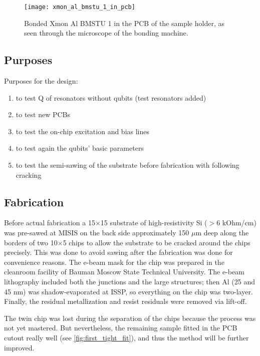 \documentclass[12pt, twoside]{report}
\numberwithin{equation}{section}
\begin{document}
\begin{figure}
\centering
\texttt{[image: xmon\_al\_bmstu\_1\_in\_pcb]}
\caption{Bonded Xmon Al BMSTU 1 in the PCB of the sample holder, as seen through the microscope of the bonding machine.}
\label{fig:first_tight_fit}
\end{figure}

\subsection{Purposes}


Purposes for the design:
\begin{enumerate}[label=(\alph*), leftmargin=1.5cm]
\itemsep0pt
\item to test Q of resonators without qubits (test resonators added)

\item to test new PCBs

\item to test the on-chip excitation and bias lines

\item to test again the qubits' basic parameters

\item to test the semi-sawing of the substrate before fabrication with following cracking

\end{enumerate}


\subsection{Fabrication}

Before actual fabrication a 15$\times$15 substrate of high-resistivity Si ($> 6$ kOhm/cm) was pre-sawed at MISIS on the back side approximately 150 $\mu$m deep along the borders of two 10$\times$5 chips to allow the substrate to be cracked around the chips precisely. This was done to avoid sawing after the fabrication was done for convenience reasons. The e-beam mask for the chip was prepared in the cleanroom facility of Bauman Moscow State Technical University. The e-beam lithography included both the junctions and the large structures; then Al (25 and 45 nm) was shadow-evaporated at ISSP, so everything on the chip was two-layer. Finally, the residual metallization and resist residuals were removed via lift-off.

The twin chip was lost during the separation of the chips because the process was not yet mastered. But nevertheless, the remaining sample fitted in the PCB cutout really well (see \autoref{fig:first_tight_fit}), and thus the method will be further improved.
\end{document}
